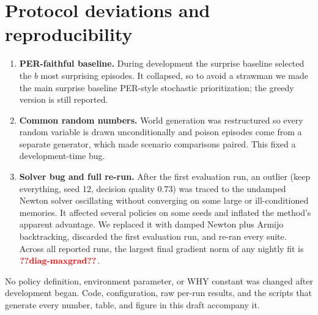 \section{Protocol deviations and reproducibility}
\label{app:deviations}
\begin{enumerate}
\item \textbf{PER-faithful baseline.} During development the surprise baseline selected the $b$ most surprising episodes. It collapsed, so to avoid a strawman we made the main surprise baseline PER-style stochastic prioritization; the greedy version is still reported.
\item \textbf{Common random numbers.} World generation was restructured so every random variable is drawn unconditionally and poison episodes come from a separate generator, which made scenario comparisons paired. This fixed a development-time bug.
\item \textbf{Solver bug and full re-run.} After the first evaluation run, an outlier (keep everything, seed 12, decision quality 0.73) was traced to the undamped Newton solver oscillating without converging on some large or ill-conditioned memories. It affected several policies on some seeds and inflated the method's apparent advantage. We replaced it with damped Newton plus Armijo backtracking, discarded the first evaluation run, and re-ran every suite. Across all  reported runs, the largest final gradient norm of any nightly fit is $\val{diag-maxgrad}$.
\end{enumerate}
No policy definition, environment parameter, or WHY constant was changed after development began. Code, configuration, raw per-run results, and the scripts that generate every number, table, and figure in this draft accompany it.
